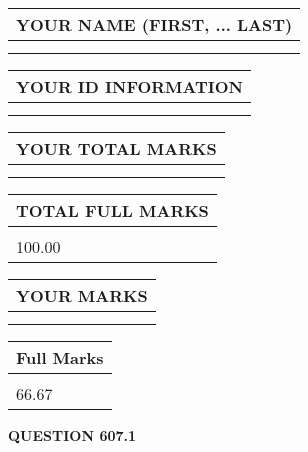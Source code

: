 \documentclass{ctexart}
\begin{document}
   
   
   
\newpage 
\setcounter{page}{ 
   607001 } 
   
   
   
   
\noindent\begin{tabular}{|l|}
\hline
YOUR NAME (FIRST, ... LAST)  \\
\hline
 \\ 
 \\ 
\hline
\end{tabular}
\hspace{0.05in} \begin{tabular}{|l|}
\hline
 YOUR   ID   INFORMATION  \\
\hline
 \\ 
 \\ 
\hline
\end{tabular}
   
   
\vspace{0.2in}\noindent\begin{tabular}{|l|}
\hline
YOUR TOTAL MARKS  \\
\hline
 \\ 
 \\ 
\hline
\end{tabular}
\hspace{0.05in} \begin{tabular}{|l|}
\hline
TOTAL FULL MARKS  \\
\hline
 \\ 
100.00 \\
\hline
\end{tabular}
   
   
 \vspace{0.2in}
 
 
 
 
   
   
  
\vspace{0.2in}
  
\noindent\begin{tabular}{|l|}
\hline
 YOUR MARKS  \\
\hline
 \\ 
 \\ 
\hline
\end{tabular}
\hspace{0.05in} \begin{tabular}{|l|}
\hline
 Full Marks  \\
\hline
 \\ 
66.67 \\
\hline
\end{tabular}
{\textbf{\Large{QUESTION
607.1 
}}}
  
\end{document}
